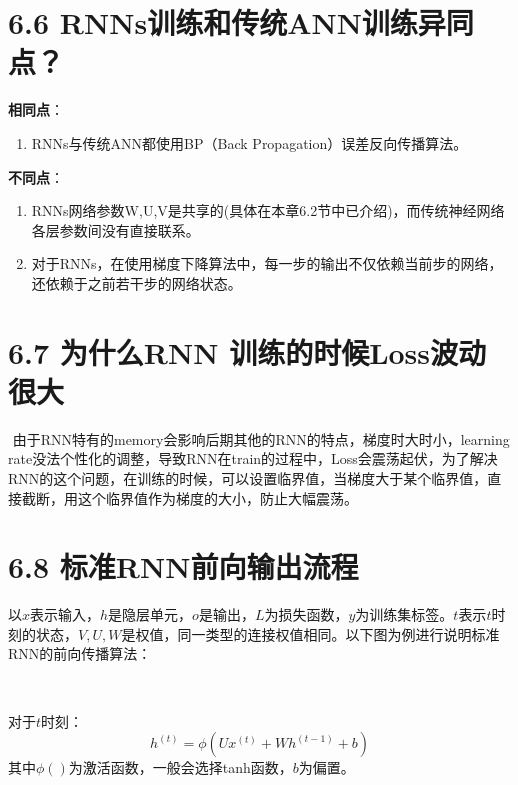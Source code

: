 \section{6.6
RNNs训练和传统ANN训练异同点？}\label{rnnsux8badux7ec3ux548cux4f20ux7edfannux8badux7ec3ux5f02ux540cux70b9}

\textbf{相同点}：

\begin{enumerate}
\def\labelenumi{\arabic{enumi}.}
\item
  RNNs与传统ANN都使用BP（Back Propagation）误差反向传播算法。
\end{enumerate}

\textbf{不同点}：

\begin{enumerate}
\def\labelenumi{\arabic{enumi}.}
\item
  RNNs网络参数W,U,V是共享的(具体在本章6.2节中已介绍)，而传统神经网络各层参数间没有直接联系。
\item
  对于RNNs，在使用梯度下降算法中，每一步的输出不仅依赖当前步的网络，还依赖于之前若干步的网络状态。
\end{enumerate}

\section{6.7 为什么RNN
训练的时候Loss波动很大}\label{ux4e3aux4ec0ux4e48rnn-ux8badux7ec3ux7684ux65f6ux5019lossux6ce2ux52a8ux5f88ux5927}

​ 由于RNN特有的memory会影响后期其他的RNN的特点，梯度时大时小，learning
rate没法个性化的调整，导致RNN在train的过程中，Loss会震荡起伏，为了解决RNN的这个问题，在训练的时候，可以设置临界值，当梯度大于某个临界值，直接截断，用这个临界值作为梯度的大小，防止大幅震荡。

\section{6.8
标准RNN前向输出流程}\label{ux6807ux51c6rnnux524dux5411ux8f93ux51faux6d41ux7a0b}

​
以\(x\)表示输入，\(h\)是隐层单元，\(o\)是输出，\(L\)为损失函数，\(y\)为训练集标签。\(t\)表示\(t\)时刻的状态，\(V,U,W\)是权值，同一类型的连接权值相同。以下图为例进行说明标准RNN的前向传播算法：

​ %

对于\(t\)时刻： \[
h^{(t)}=\phi(Ux^{(t)}+Wh^{(t-1)}+b)
\] 其中\(\phi()\)为激活函数，一般会选择tanh函数，\(b\)为偏置。


